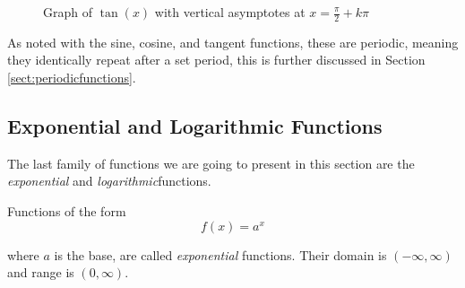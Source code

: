         \begin{figure}
            \centering
            \caption{Graph of $\tan(x)$ with vertical asymptotes at $x = \frac{\pi}{2} + k\pi$}
            \label{fig:tangentgraph}
        \end{figure}

        As noted with the sine, cosine, and tangent functions, these are periodic, meaning they identically repeat after a set period, this is further discussed in Section \ref{sect:periodicfunctions}.

        \subsection{Exponential and Logarithmic Functions}
        \label{sect:explog}
        The last family of functions we are going to present in this section are the \textit{exponential} and \textit{logarithmic}functions.

        \begin{definition}
            Functions of the form
            \begin{equation}
                f(x) = a^x
            \end{equation}

            where $a$ is the base, are called \textit{exponential} functions. Their domain is $(-\infty,\infty)$ and range is $(0,\infty)$.
        \end{definition}

